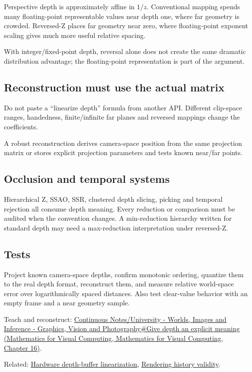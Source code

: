 Perspective depth is approximately affine in \(1/z\). Conventional mapping spends many floating-point representable values near depth one, where far geometry is crowded. Reversed-Z places far geometry near zero, where floating-point exponent scaling gives much more useful relative spacing.

With integer/fixed-point depth, reversal alone does not create the same dramatic distribution advantage; the floating-point representation is part of the argument.

\subsection{Reconstruction must use the actual matrix}\label{appendix-275ec8847057-reconstruction-must-use-the-actual-matrix}

Do not paste a ``linearize depth'' formula from another API. Different clip-space ranges, handedness, finite/infinite far planes and reversed mappings change the coefficients.

A robust reconstruction derives camera-space position from the same projection matrix or stores explicit projection parameters and tests known near/far points.

\subsection{Occlusion and temporal systems}\label{appendix-275ec8847057-occlusion-and-temporal-systems}

Hierarchical Z, SSAO, SSR, clustered depth slicing, picking and temporal rejection all consume depth meaning. Every reduction or comparison must be audited when the convention changes. A min-reduction hierarchy written for standard depth may need a max-reduction interpretation under reversed-Z.

\subsection{Tests}\label{appendix-275ec8847057-tests}

Project known camera-space depths, confirm monotonic ordering, quantize them to the real depth format, reconstruct them, and measure relative world-space error over logarithmically spaced distances. Also test clear-value behavior with an empty frame and a near geometry sample.

Teach and reconstruct: \href{../02-Mathematics-for-Visual-Computing/main.pdf\#nameddest=03-visual-computing-i-ch012-give-depth-an-explicit-meaning}{Continuous Notes/University - Worlds, Images and Inference - Graphics, Vision and Photography\#Give depth an explicit meaning (Mathematics for Visual Computing, Mathematics for Visual Computing, Chapter 16)}.

Related: \hyperref[appendix-1bc40b08db4a]{Hardware depth-buffer linearization}, \hyperref[appendix-2e7e9fd28a2c]{Rendering history validity}.

